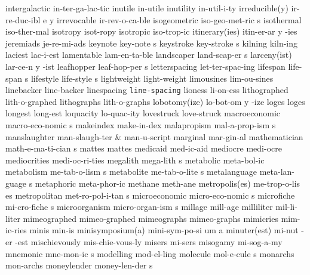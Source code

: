 \1 intergalactic	in-ter-ga-lac-tic
\1 inutile		in-utile
\1 inutility		in-util-i-ty
\3 irreducible(y)       ir-re-duc-ibl e y       %
\1 irrevocable		ir-rev-o-ca-ble
\NewWordtrue
\5 isogeometric		iso-geo-met-ric s	%
\NewWordtrue
\1 isothermal		iso-ther-mal		%
\1 isotropy		isot-ropy		%
\1 isotropic		iso-trop-ic		%
\3 itinerary(ies)	itin-er-ar y -ies
\1 jeremiads		je-re-mi-ads
\5 keynote		key-note s		%
\5 keystroke		key-stroke s
\1 kilning		kiln-ing
\1 laciest		lac-i-est
\1 lamentable		lam-en-ta-ble
\5 landscaper		land-scap-er s
\3 larceny(ist) 	lar-ce-n y -ist
\5 leafhopper		leaf-hop-per s	%
\1 letterspacing	let-ter-spac-ing
\5 lifespan		life-span s
\5 lifestyle		life-style s            %
\1 lightweight		light-weight
\1 limousines		lim-ou-sines
\1 linebacker		line-backer
\1 linespacing		{\tt\bs line-spacing}
\1 lioness		li-on-ess            %
\1 lithographed		lith-o-graphed
\1 lithographs		lith-o-graphs
\3 lobotomy(ize)	lo-bot-om y -ize
\1 loges		loges
\1 longest		long-est
\1 loquacity		lo-quac-ity          %
\1 lovestruck           love-struck          %
\5 macroeconomic	macro-eco-nomic s
\NewWordtrue
\1 makeindex		make-in-dex		%
\5 malapropism		mal-a-prop-ism s
\1 manslaughter		man-slaugh-ter		%
 & man-u-script \cr
\1 marginal		mar-gin-al
\5 mathematician	math-e-ma-ti-cian s
\1 mattes		mattes
\1 medicaid		med-ic-aid
\1 mediocre		medi-ocre
\1 mediocrities		medi-oc-ri-ties
\5 megalith		mega-lith s
\1 metabolic		meta-bol-ic
\5 metabolism		me-tab-o-lism s
\5 metabolite		me-tab-o-lite s
\5 metalanguage		meta-lan-guage s
\1 metaphoric		meta-phor-ic		%
\1 methane		meth-ane		%
\2 metropolis(es)	me-trop-o-lis es
\5 metropolitan		met-ro-pol-i-tan s
\5 microeconomic	micro-eco-nomic s
\5 microfiche		mi-cro-fiche s
\5 microorganism	micro-organ-ism s	%
\1 millage		mill-age
\1 milliliter		mil-li-liter
\1 mimeographed 	mimeo-graphed
\1 mimeographs		mimeo-graphs
\1 mimicries		mim-ic-ries
\1 minis		min-is
\3 minisymposium(a)	mini-sym-po-si um a
\3 minuter(est)		mi-nut -er -est
\1 mischievously	mis-chie-vous-ly
\1 misers		mi-sers
\1 misogamy		mi-sog-a-my
\NewWordtrue
\5 mnemonic		mne-mon-ic s		%
\1 modelling		mod-el-ling
\5 molecule		mol-e-cule s
\1 monarchs		mon-archs
\5 moneylender		money-len-der s
